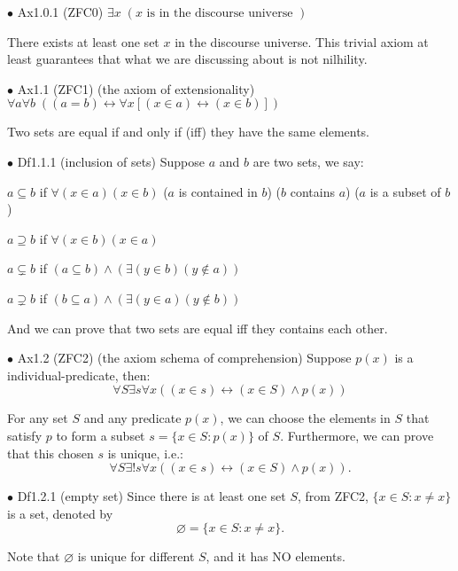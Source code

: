 \documentclass{article}
\begin{document}
\begin{Ax}{$\bullet$ Ax1.0.1 (ZFC0)}
    \textcolor{Ax}{$\exists x\; (x \text{ is in the discourse universe })$}
\end{Ax}
There exists at least one set $x$ in the discourse universe. This trivial axiom at least guarantees that what we are discussing about is not nilhility.

\begin{Ax}{$\bullet$ Ax1.1 (ZFC1) (the axiom of extensionality)}
    \textcolor{Ax}{$\forall a\forall b \;\left((a=b)\leftrightarrow \forall x [(x\in a)\leftrightarrow (x\in b)]\right)$}
\end{Ax}
Two sets are equal if and only if (iff) they have the same elements.

\begin{Df}{$\bullet$ Df1.1.1 (inclusion of sets)}
    Suppose $a$ and $b$ are two sets, we say:
    \begin{compactitem}
        \item $a\subseteq b$ if $\forall (x\in a) (x\in b)$ \quad($a$ is contained in $b$) ($b$ contains $a$) ($a$ is a subset of $b$)
        \item $a\supseteq b$ if $\forall (x\in b) (x\in a)$
        \item $a\subsetneq b$ if $(a\subseteq b)\land (\exists (y\in b) (y\notin a))$
        \item $a\supsetneq b$ if $(b\subseteq a)\land (\exists (y\in a) (y\notin b))$ 
    \end{compactitem}
\end{Df}
And we can prove that \textcolor{Th}{two sets are equal iff they contains each other.}

\begin{Ax}{$\bullet$ Ax1.2 (ZFC2) (the axiom schema of comprehension) }
    \textcolor{Ax}{Suppose $p(x)$ is a individual-predicate, then:
    $$\forall S\exists s\forall x\left((x\in s)\leftrightarrow (x\in S)\land p(x)\right)$$}
\end{Ax}
For any set $S$ and any predicate $p(x)$, we can choose the elements in $S$ that satisfy $p$ to form a subset $s=\{x\in S: p(x)\}$ of $S$. \textcolor{Th}{Furthermore, we can prove that this chosen $s$ is unique, i.e.:
    $$\forall S\exists! s\forall x\left((x\in s)\leftrightarrow (x\in S)\land p(x)\right).$$}

\begin{Df}{$\bullet$ Df1.2.1 (empty set)}
    Since there is at least one set $S$, from ZFC2, $\{x\in S: x\neq x\}$ is a set, denoted by $$\varnothing = \{x\in S: x\neq x\}.$$ 
\end{Df}
\textcolor{Th}{Note that $\varnothing$ is unique for different $S$, and it has NO elements.}
\end{document}

